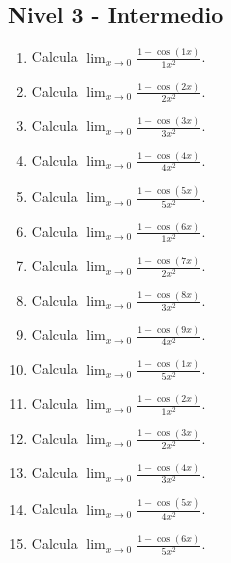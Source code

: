 \documentclass[11pt,a4paper]{article}
\begin{document}
\newpage

\subsection{Nivel 3 - Intermedio}

\begin{enumerate}[label=\textbf{E\arabic*.},start=441]

\item Calcula $\displaystyle\lim_{x\to0}\frac{1-\cos(1x)}{1x^2}$.

\item Calcula $\displaystyle\lim_{x\to0}\frac{1-\cos(2x)}{2x^2}$.

\item Calcula $\displaystyle\lim_{x\to0}\frac{1-\cos(3x)}{3x^2}$.

\item Calcula $\displaystyle\lim_{x\to0}\frac{1-\cos(4x)}{4x^2}$.

\item Calcula $\displaystyle\lim_{x\to0}\frac{1-\cos(5x)}{5x^2}$.

\item Calcula $\displaystyle\lim_{x\to0}\frac{1-\cos(6x)}{1x^2}$.

\item Calcula $\displaystyle\lim_{x\to0}\frac{1-\cos(7x)}{2x^2}$.

\item Calcula $\displaystyle\lim_{x\to0}\frac{1-\cos(8x)}{3x^2}$.

\item Calcula $\displaystyle\lim_{x\to0}\frac{1-\cos(9x)}{4x^2}$.

\item Calcula $\displaystyle\lim_{x\to0}\frac{1-\cos(1x)}{5x^2}$.

\item Calcula $\displaystyle\lim_{x\to0}\frac{1-\cos(2x)}{1x^2}$.

\item Calcula $\displaystyle\lim_{x\to0}\frac{1-\cos(3x)}{2x^2}$.

\item Calcula $\displaystyle\lim_{x\to0}\frac{1-\cos(4x)}{3x^2}$.

\item Calcula $\displaystyle\lim_{x\to0}\frac{1-\cos(5x)}{4x^2}$.

\item Calcula $\displaystyle\lim_{x\to0}\frac{1-\cos(6x)}{5x^2}$.


\end{enumerate}
\end{document}
